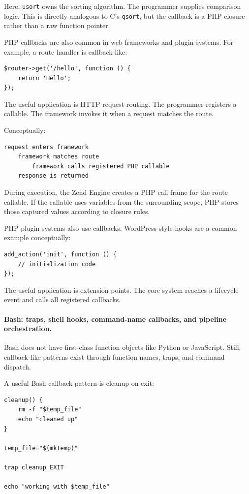 \documentclass[a4paper,twoside]{report}
\begin{document}
Here, \texttt{usort} owns the sorting algorithm. The programmer supplies comparison logic. This is directly analogous to C's \texttt{qsort}, but the callback is a PHP closure rather than a raw function pointer.

PHP callbacks are also common in web frameworks and plugin systems. For example, a route handler is callback-like:

\begin{verbatim}
$router->get('/hello', function () {
    return 'Hello';
});
\end{verbatim}

The useful application is HTTP request routing. The programmer registers a callable. The framework invokes it when a request matches the route.

Conceptually:

\begin{verbatim}
request enters framework
    framework matches route
        framework calls registered PHP callable
    response is returned
\end{verbatim}

During execution, the Zend Engine creates a PHP call frame for the route callable. If the callable uses variables from the surrounding scope, PHP stores those captured values according to closure rules.

PHP plugin systems also use callbacks. WordPress-style hooks are a common example conceptually:

\begin{verbatim}
add_action('init', function () {
    // initialization code
});
\end{verbatim}

The useful application is extension points. The core system reaches a lifecycle event and calls all registered callbacks.

\paragraph{Bash: traps, shell hooks, command-name callbacks, and pipeline orchestration.}

Bash does not have first-class function objects like Python or JavaScript. Still, callback-like patterns exist through function names, traps, and command dispatch.

A useful Bash callback pattern is cleanup on exit:

\begin{verbatim}
cleanup() {
    rm -f "$temp_file"
    echo "cleaned up"
}

temp_file="$(mktemp)"

trap cleanup EXIT

echo "working with $temp_file"
\end{verbatim}
\end{document}
